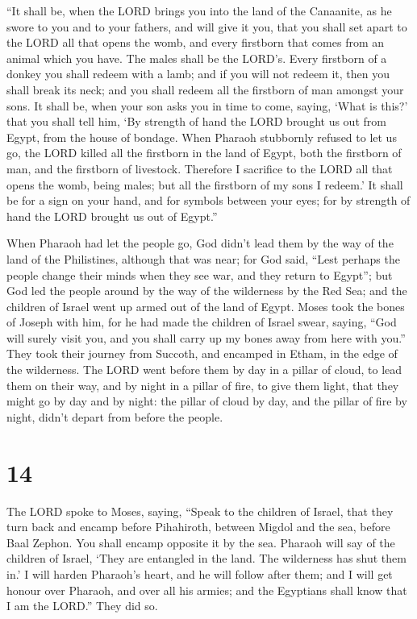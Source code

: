  ``It shall be, when the LORD brings you into the land of
the Canaanite, as he swore to you and to your fathers, and will give it
you,  that you shall set apart to the LORD all that opens
the womb, and every firstborn that comes from an animal which you have.
The males shall be the LORD's.  Every firstborn of a donkey
you shall redeem with a lamb; and if you will not redeem it, then you
shall break its neck; and you shall redeem all the firstborn of man
amongst your sons.  It shall be, when your son asks you in
time to come, saying, `What is this?' that you shall tell him, `By
strength of hand the LORD brought us out from Egypt, from the house of
bondage.  When Pharaoh stubbornly refused to let us go, the
LORD killed all the firstborn in the land of Egypt, both the firstborn
of man, and the firstborn of livestock. Therefore I sacrifice to the
LORD all that opens the womb, being males; but all the firstborn of my
sons I redeem.'  It shall be for a sign on your hand, and
for symbols between your eyes; for by strength of hand the LORD brought
us out of Egypt.''

 When Pharaoh had let the people go, God didn't lead them
by the way of the land of the Philistines, although that was near; for
God said, ``Lest perhaps the people change their minds when they see
war, and they return to Egypt'';  but God led the people
around by the way of the wilderness by the Red Sea; and the children of
Israel went up armed out of the land of Egypt.  Moses took
the bones of Joseph with him, for he had made the children of Israel
swear, saying, ``God will surely visit you, and you shall carry up my
bones away from here with you.''  They took their journey
from Succoth, and encamped in Etham, in the edge of the wilderness.
 The LORD went before them by day in a pillar of cloud, to
lead them on their way, and by night in a pillar of fire, to give them
light, that they might go by day and by night:  the pillar
of cloud by day, and the pillar of fire by night, didn't depart from
before the people.

\hypertarget{section-13}{%
\section{14}\label{section-13}}

 The LORD spoke to Moses, saying,  ``Speak to
the children of Israel, that they turn back and encamp before
Pihahiroth, between Migdol and the sea, before Baal Zephon. You shall
encamp opposite it by the sea.  Pharaoh will say of the
children of Israel, `They are entangled in the land. The wilderness has
shut them in.'  I will harden Pharaoh's heart, and he will
follow after them; and I will get honour over Pharaoh, and over all his
armies; and the Egyptians shall know that I am the LORD.'' They did so.

